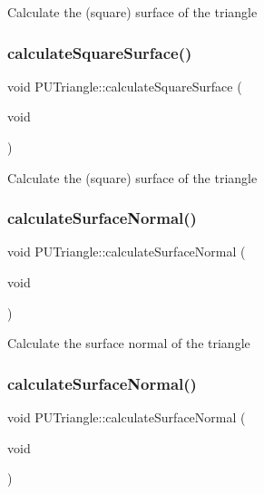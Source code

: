 Calculate the (square) surface of the triangle \mbox{\label{classPUTriangle_a346b241c7794e565c33876f0dded6d46}} 
\subsubsection{\texorpdfstring{calculate\+Square\+Surface()}{calculateSquareSurface()}\hspace{0.1cm}{\footnotesize\ttfamily [2/2]}}
{\footnotesize\ttfamily void P\+U\+Triangle\+::calculate\+Square\+Surface (\begin{DoxyParamCaption}\item[{void}]{ }\end{DoxyParamCaption})}

Calculate the (square) surface of the triangle \mbox{\label{classPUTriangle_a7527b8e00cead35dbddddd5d2902f2ac}} 
\subsubsection{\texorpdfstring{calculate\+Surface\+Normal()}{calculateSurfaceNormal()}\hspace{0.1cm}{\footnotesize\ttfamily [1/2]}}
{\footnotesize\ttfamily void P\+U\+Triangle\+::calculate\+Surface\+Normal (\begin{DoxyParamCaption}\item[{void}]{ }\end{DoxyParamCaption})\hspace{0.3cm}{\ttfamily [inline]}}

Calculate the surface normal of the triangle \mbox{\label{classPUTriangle_a7527b8e00cead35dbddddd5d2902f2ac}} 
\subsubsection{\texorpdfstring{calculate\+Surface\+Normal()}{calculateSurfaceNormal()}\hspace{0.1cm}{\footnotesize\ttfamily [2/2]}}
{\footnotesize\ttfamily void P\+U\+Triangle\+::calculate\+Surface\+Normal (\begin{DoxyParamCaption}\item[{void}]{ }\end{DoxyParamCaption})}

